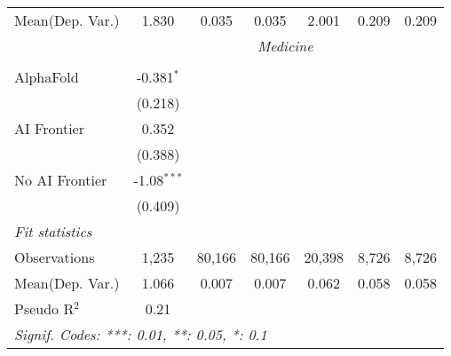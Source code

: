 \begin{tabular}{lcccccc}
Mean(Dep. Var.) & 1.830 & 0.035 & 0.035 & 2.001 & 0.209 & 0.209 \\
 & \multicolumn{6}{c}{\textit{Medicine}} \\ \\
   AlphaFold      & -0.381$^{*}$  &        &        &        &       &   \\   
                  & (0.218)       &        &        &        &       &   \\   
   AI Frontier    & 0.352         &        &        &        &       &   \\   
                  & (0.388)       &        &        &        &       &   \\   
   No AI Frontier & -1.08$^{***}$ &        &        &        &       &   \\   
                  & (0.409)       &        &        &        &       &   \\   
   \midrule
   \emph{Fit statistics}\\
   Observations   & 1,235         & 80,166 & 80,166 & 20,398 & 8,726 & 8,726\\  
Mean(Dep. Var.) & 1.066 & 0.007 & 0.007 & 0.062 & 0.058 & 0.058 \\
   Pseudo R$^2$   & 0.21          &        &        &        &       & \\  
   \midrule \midrule
   \multicolumn{7}{l}{\emph{Signif. Codes: ***: 0.01, **: 0.05, *: 0.1}}\\
\end{tabular}
\par\endgroup
